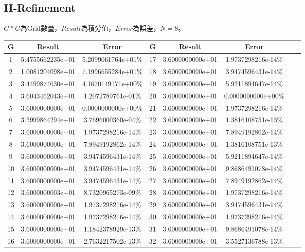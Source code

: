 \documentclass[a4paper,12pt]{article}
\begin{document}
\subsection{H-Refinement}
$G * G$為Grid數量，$Result$為積分值，$Error$為誤差，$N = 8$。
\begin{longtable}{|c|c|c|c|c|c|c|c|}
    \hline
    G & Result & Error & G & Result & Error\\
    \hline
    1 & 5.4755662235e+01 & 5.2099061764e+01\% & 17 & 3.6000000000e+01 & 1.9737298216e-14\% \\
    \hline
    2 & 1.0081204098e+01 & 7.1996655284e+01\% & 18 & 3.6000000000e+01 & 3.9474596431e-14\% \\
    \hline
    3 & 3.4499874630e+01 & 4.1670149171e+00\% & 19 & 3.6000000000e+01 & 5.9211894647e-14\% \\
    \hline
    4 & 3.6043462043e+01 & 1.2072789761e-01\% & 20 & 3.6000000000e+01 & 0.0000000000e+00\% \\
    \hline
    5 & 3.6000000000e+01 & 0.0000000000e+00\% & 21 & 3.6000000000e+01 & 1.9737298216e-14\% \\
    \hline
    6 & 3.5999864294e+01 & 3.7696000360e-04\% & 22 & 3.6000000000e+01 & 1.3816108751e-13\% \\
    \hline
    7 & 3.6000000000e+01 & 1.9737298216e-14\% & 23 & 3.6000000000e+01 & 7.8949192862e-14\% \\
    \hline
    8 & 3.6000000000e+01 & 7.8949192862e-14\% & 24 & 3.6000000000e+01 & 1.3816108751e-13\% \\
    \hline
    9 & 3.6000000000e+01 & 3.9474596431e-14\% & 25 & 3.6000000000e+01 & 5.9211894647e-14\% \\
    \hline
    10 & 3.6000000000e+01 & 3.9474596431e-14\% & 26 & 3.6000000000e+01 & 9.8686491078e-14\% \\
    \hline
    11 & 3.6000000000e+01 & 3.9474596431e-14\% & 27 & 3.6000000000e+01 & 7.8949192862e-14\% \\
    \hline
    12 & 3.6000000003e+01 & 8.7320965273e-09\% & 28 & 3.6000000000e+01 & 1.9737298216e-14\% \\
    \hline
    13 & 3.6000000000e+01 & 1.9737298216e-14\% & 29 & 3.6000000000e+01 & 3.9474596431e-14\% \\
    \hline
    14 & 3.6000000000e+01 & 1.9737298216e-14\% & 30 & 3.6000000000e+01 & 1.9737298216e-14\% \\
    \hline
    15 & 3.6000000000e+01 & 1.1842378929e-13\% & 31 & 3.6000000000e+01 & 9.8686491078e-14\% \\
    \hline
    16 & 3.6000000000e+01 & 2.7632217502e-13\% & 32 & 3.6000000000e+01 & 3.5527136788e-13\% \\
    \hline

\end{longtable}
\end{document}
